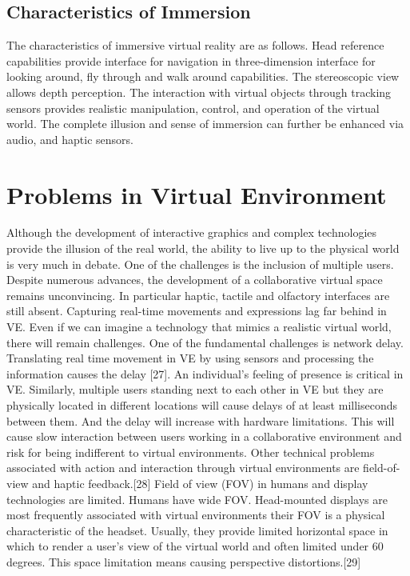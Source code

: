 \subsection{Characteristics of Immersion}
The characteristics of immersive virtual reality are as follows. Head reference capabilities provide interface for navigation in three-dimension interface for looking around, fly through and walk around capabilities. The stereoscopic view allows depth perception. The interaction with virtual objects through tracking sensors provides realistic manipulation, control, and operation of the virtual world. The complete illusion and sense of immersion can further be enhanced via audio, and haptic sensors.


\section{Problems in Virtual Environment}
Although the development of interactive graphics and complex technologies provide the illusion of the real world, the ability to live up to the physical world is very much in debate. One of the challenges is the inclusion of multiple users. Despite numerous advances, the development of a collaborative virtual space remains unconvincing. In particular haptic, tactile and olfactory interfaces are still absent. Capturing real-time movements and expressions lag far behind in VE. Even if we can imagine a technology that mimics a realistic virtual world, there will remain challenges. One of the fundamental challenges is network delay. Translating real time movement in VE by using sensors and processing the information causes the delay [27]. An individual’s feeling of presence is critical in VE. Similarly, multiple users standing next to each other in VE but they are physically located in different locations will cause delays of at least milliseconds between them. And the delay will increase with hardware limitations. This will cause slow interaction between users working in a collaborative environment and risk for being indifferent to virtual environments. Other technical problems associated with action and interaction through virtual environments are field-of-view and haptic feedback.[28] 
Field of view (FOV) in humans and display technologies are limited. Humans have wide FOV.  Head-mounted displays are most frequently associated with virtual environments their FOV is a physical characteristic of the headset. Usually, they provide limited horizontal space in which to render a user’s view of the virtual world and often limited under 60 degrees. This space limitation means causing perspective distortions.[29] 
